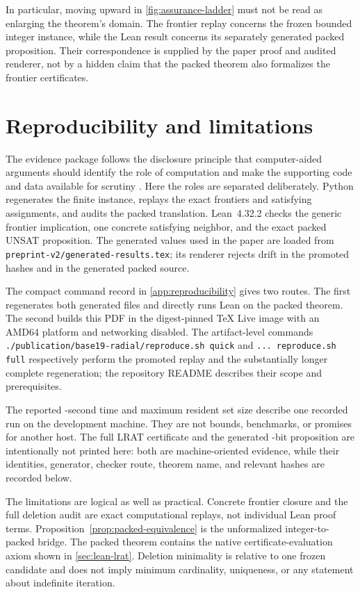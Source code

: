 \documentclass[11pt,twoside]{article}
\theoremstyle{remark}
\begin{document}
In particular, moving upward in \cref{fig:assurance-ladder} must not be read
as enlarging the theorem's domain.  The frontier replay concerns the frozen
bounded integer instance, while the Lean result concerns its separately
generated packed proposition.  Their correspondence is supplied by the paper
proof and audited renderer, not by a hidden claim that the packed theorem also
formalizes the frontier certificates.

\section{Reproducibility and limitations}
\label{sec:reproducibility}
The evidence package follows the disclosure principle that computer-aided
arguments should identify the role of computation and make the supporting
code and data available for scrutiny \cite{lmsComputerAidedProofs}.  Here the
roles are separated deliberately.  Python regenerates the finite instance,
replays the exact frontiers and satisfying assignments, and audits the packed
translation.  Lean~4.32.2 checks the generic frontier implication, one
concrete satisfying neighbor, and the exact packed UNSAT proposition.  The
generated values used in the paper are loaded from
\texttt{preprint-v2/generated-results.tex}; its renderer rejects drift in the
promoted hashes and in the generated packed source.

The compact command record in \cref{app:reproducibility} gives two routes.
The first regenerates both generated files and directly runs Lean on the
packed theorem.  The second builds this PDF in the digest-pinned TeX Live
image with an AMD64 platform and networking disabled.  The artifact-level
commands \texttt{./publication/base19-radial/reproduce.sh quick} and
\texttt{... reproduce.sh full} respectively perform the promoted replay and
the substantially longer complete regeneration; the repository README
describes their scope and prerequisites.

The reported \PackedLeanSeconds-second time and \PackedLeanMaxRSS{} maximum
resident set size describe one recorded run on the development machine.  They
are not bounds, benchmarks, or promises for another host.  The full LRAT
certificate and the generated \PackedWidth-bit proposition are intentionally
not printed here: both are machine-oriented evidence, while their identities,
generator, checker route, theorem name, and relevant hashes are recorded
below.

The limitations are logical as well as practical.  Concrete frontier closure
and the full deletion audit are exact computational replays, not individual
Lean proof terms.  Proposition~\ref{prop:packed-equivalence} is the
unformalized integer-to-packed bridge.  The packed theorem contains the native
certificate-evaluation axiom shown in \cref{sec:lean-lrat}.  Deletion
minimality is relative to one frozen candidate and does not imply minimum
cardinality, uniqueness, or any statement about indefinite iteration.
\end{document}
